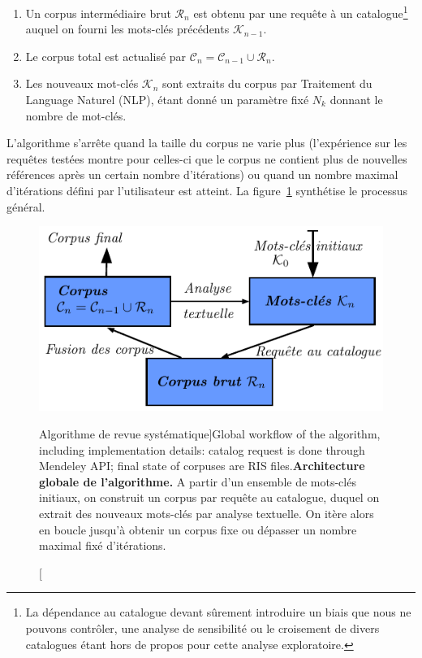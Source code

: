 {\begin{enumerate}
\item Un corpus intermédiaire brut $\mathcal{R}_n$ est obtenu par une requête à un catalogue\footnote{La dépendance au catalogue devant sûrement introduire un biais que nous ne pouvons contrôler, une analyse de sensibilité ou le croisement de divers catalogues étant hors de propos pour cette analyse exploratoire.}
 auquel on fourni les mots-clés précédents $\mathcal{K}_{n-1}$.
\item Le corpus total est actualisé par $\mathcal{C}_n = \mathcal{C}_{n-1} \cup \mathcal{R}_n$.
\item Les nouveaux mot-clés $\mathcal{K}_n$ sont extraits du corpus par Traitement du Language Naturel (NLP), étant donné un paramètre fixé $N_k$ donnant le nombre de mot-clés.
\end{enumerate}

L'algorithme s'arrête quand la taille du corpus ne varie plus (l'expérience sur les requêtes testées montre pour celles-ci que le corpus ne contient plus de nouvelles références après un certain nombre d'itérations) ou quand un nombre maximal d'itérations défini par l'utilisateur est atteint. La figure~\ref{fig:quantepistemo:algo} synthétise le processus général.
}


\begin{figure}
\centering
\includegraphics[width=0.8\linewidth]{Figures/QuantEpistemo/schema_algo}
\caption[Systematic review algorithm workflow][Algorithme de revue systématique]{Global workflow of the algorithm, including implementation details: catalog request is done through Mendeley API; final state of corpuses are RIS files.\label{fig:quantepistemo:algo}}{\textbf{Architecture globale de l'algorithme.} A partir d'un ensemble de mots-clés initiaux, on construit un corpus par requête au catalogue, duquel on extrait des nouveaux mots-clés par analyse textuelle. On itère alors en boucle jusqu'à obtenir un corpus fixe ou dépasser un nombre maximal fixé d'itérations.\label{fig:quantepistemo:algo}}
\end{figure}



